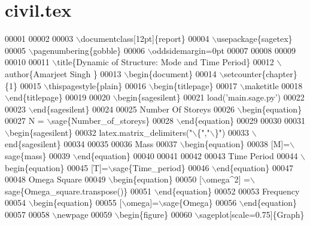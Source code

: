 \hypertarget{civil_8tex_source}{}\section{civil.\+tex}
\label{civil_8tex_source}

\begin{DoxyCode}
00001 %
00002 %
00003 \(\backslash\)documentclass[12pt]\{report\}
00004 \(\backslash\)usepackage\{sagetex\}
00005 \(\backslash\)pagenumbering\{gobble\}
00006 \(\backslash\)oddsidemargin=0pt
00007 
00008 %
00009 %
00010 %
00011 \(\backslash\)title\{Dynamic of Structure: Mode and Time Period\}
00012 \(\backslash\)author\{Amarjeet Singh \}
00013 \(\backslash\)begin\{document\}
00014 \(\backslash\)setcounter\{chapter\}\{1\}
00015 \(\backslash\)thispagestyle\{plain\}
00016    \(\backslash\)begin\{titlepage\}
00017 \(\backslash\)maketitle
00018    \(\backslash\)end\{titlepage\}
00019 
00020 \(\backslash\)begin\{sagesilent\}
00021    load('main.sage.py')
00022 
00023 \(\backslash\)end\{sagesilent\}
00024 
00025 Number Of Storeys
00026 \(\backslash\)begin\{equation\}
00027    N = \(\backslash\)sage\{Number\_of\_storeys\}
00028 \(\backslash\)end\{equation\}
00029 
00030 
00031 \(\backslash\)begin\{sagesilent\}
00032 latex.matrix\_delimiters("\(\backslash\)\{","\(\backslash\)\}")
00033 \(\backslash\)end\{sagesilent\}
00034 
00035 
00036 Mass
00037 \(\backslash\)begin\{equation\}
00038     [M]=\(\backslash\)sage\{mass\}
00039 \(\backslash\)end\{equation\}
00040 
00041 
00042 
00043 Time Period
00044 \(\backslash\)begin\{equation\}
00045    [T]=\(\backslash\)sage\{Time\_period\}
00046 \(\backslash\)end\{equation\}
00047 
00048 Omega Square
00049 \(\backslash\)begin\{equation\}
00050    [\(\backslash\)omega^2] =\(\backslash\)sage\{Omega\_square.transpose()\}
00051 \(\backslash\)end\{equation\}
00052 
00053 Frequency
00054 \(\backslash\)begin\{equation\}
00055    [\(\backslash\)omega]=\(\backslash\)sage\{Omega\}
00056 \(\backslash\)end\{equation\}
00057 
00058 \(\backslash\)newpage
00059 \(\backslash\)begin\{figure\}
00060    \(\backslash\)sageplot[scale=0.75]\{Graph\}

\end{DoxyCode}
